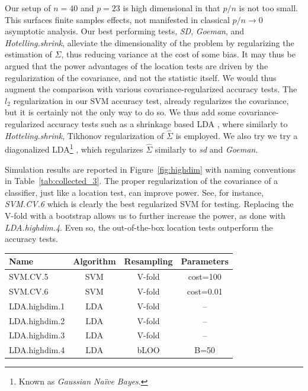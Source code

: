 \documentclass[12pt,a4paper]{article}
\begin{document}
Our setup of $n=40$ and $p=23$ is high dimensional in that $p/n$ is not too small. 
This surfaces finite samples effects, not manifested in classical $p/n \to 0$ asymptotic analysis.
Our best performing tests, \emph{SD}, \emph{Goeman}, and \emph{Hotelling.shrink}, alleviate the dimensionality of the problem by regularizing the estimation of $\Sigma$, thus reducing variance at the cost of some bias. 
It may thus be argued that the power advantages of the location tests are driven by the regularization of the covariance, and not the statistic itself.
We would thus augment the comparison with various covariance-regularized accuracy tests.
The $l_2$ regularization in our SVM accuracy test, already regularizes the covariance, but it is certainly not the only way to do so. 
We thus add some covariance-regularized accuracy tests such as a shrinkage based LDA \citep{pang_shrinkage-based_2009,ramey_high-dimensional_2016}, where similarly to \emph{Hotteling.shrink}, Tikhonov regularization of $\hat \Sigma$ is employed. 
We also try we try a diagonalized LDA\footnote{Known as \emph{Gaussian Na\"ive Bayes}.} \citep{dudoit_comparison_2002}, which regularizes $\hat{\Sigma}$ similarly to \emph{sd} and \emph{Goeman}.

Simulation results are reported in Figure~\ref{fig:highdim} with naming conventions in Table~\ref{tab:collected_3}.
The proper regularization of the covariance of a classifier, just like a location test, can improve power. 
See, for instance, \emph{SVM.CV.6} which is clearly the best regularized SVM for testing. 
Replacing the V-fold  with a bootstrap allows us to further increase the power, as done with \emph{LDA.highdim.4}.
Even so, the out-of-the-box location tests outperform the accuracy tests.

\bigskip

\begin{tcolorbox}
	\centering
	\begin{tabular}{l|c|c|c}
		Name & Algorithm & Resampling &  Parameters\\ 
		\hline
		\hline
		SVM.CV.5 & SVM & V-fold & cost=100 \\ 
		SVM.CV.6 & SVM & V-fold & cost=0.01\\ 
		LDA.highdim.1 & LDA & V-fold & -- \\ 
		LDA.highdim.2 & LDA & V-fold & -- \\ 
		LDA.highdim.3 & LDA & V-fold & -- \\ 
		LDA.highdim.4 & LDA & bLOO 	 & B=50 \\ 
	\end{tabular} 
	\captionsetup{type=table}
	\caption{
		The same as Table~\ref{tab:collected} for regularized (high dimensional) predictors. 
		\emph{SVM.CV.5} and \emph{SVM.CV.6} are $l_2$ regularized SVM, with varying regularization penalty.
		\emph{LDA.highdim.1} is the Diagonal Linear Discriminant Analysis of \cite{dudoit_comparison_2002}.
		\emph{LDA.highdim.2} is the High-Dimensional Regularized Discriminant Analysis of \cite{ramey_high-dimensional_2016}.
		\emph{LDA.highdim.3} is the Shrinkage-based Diagonal Linear Discriminant Analysis of \cite{pang_shrinkage-based_2009}.
		\emph{LDA.highdim.4} is the same with bLOO.
	} 
	\label{tab:collected_3}
\end{tcolorbox}
\end{document}
